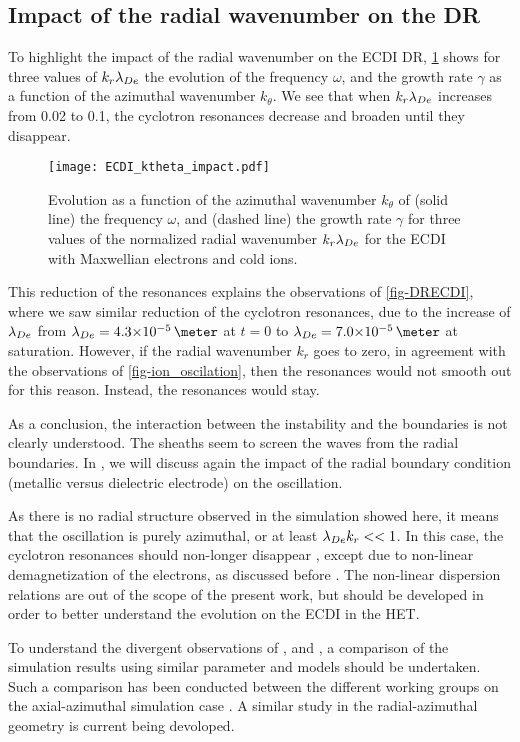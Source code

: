   \subsection{Impact of the radial wavenumber on the \acs{DR}}
   \label{subsec-kr}

  To highlight the impact of the radial wavenumber on the \ac{ECDI} \ac{DR}, \cref{fig-kreffect} shows for three values of $k_r \lambda_{De}$ the evolution of the frequency $\omega$, and  the growth rate $\gamma$ as a function of the azimuthal wavenumber $k_{\theta}$.
  We see that when $k_r \lambda_{De}$ increases from 0.02 to 0.1, the cyclotron resonances decrease and broaden until they disappear.
  \begin{figure}[!hbt]
    \centering
    \texttt{[image: ECDI\_ktheta\_impact.pdf]}
    \caption{Evolution as a function of the azimuthal wavenumber $k_{\theta}$ of (solid line) the frequency $\omega$, and (dashed line) the growth rate $\gamma$ for three values of the normalized radial wavenumber $k_r \lambda_{De}$ for the \acs{ECDI} with Maxwellian electrons and cold ions. }
    \label{fig-kreffect}
  \end{figure}
  
  This reduction of the resonances explains the observations of \cref{fig-DRECDI}, where we saw similar reduction of the cyclotron resonances, due to the increase of $\lambda_{De}$ from $\lde=\sn{4.3}{-5}\,\meter$ at $t=0$ to $\lde=\sn{7.0}{-5}\,\meter$ at saturation.
  However, if the radial wavenumber $k_r$ goes to zero, in agreement with the observations of \cref{fig-ion_oscilation}, then the resonances would not smooth out for this reason.
  Instead, the resonances would stay.
  
  \vspace{1em}
  As a conclusion, the interaction between the instability and the boundaries is not clearly understood.
  The sheaths seem to  screen the waves from the radial boundaries.
  In , we will discuss again the impact of the radial boundary condition (metallic versus dielectric electrode) on the oscillation.

  As there is no radial structure observed in the simulation showed here, it means that the oscillation is purely azimuthal, or at least $\lambda_{De} k_r <<1$.
  In this case, the cyclotron resonances should non-longer disappear \citep{ducrocq2006}, except due to non-linear demagnetization of the electrons, as discussed before \citep{boeuf2018,taccogna2019}.
  The non-linear dispersion relations are out of the scope of the present work, but should be developed in order to better understand the evolution on the \ac{ECDI} in the \ac{HET}.
  
  To understand the divergent observations of \citet{hara2019a,janhunen2018}, and \citet{taccogna2019}, a comparison of the simulation results using similar parameter and models should be undertaken.
  Such a comparison has been conducted between the different working groups on the axial-azimuthal simulation case \citep{charoy2019}.
  A similar study in the radial-azimuthal geometry is current being devoloped.
  
  
  
  